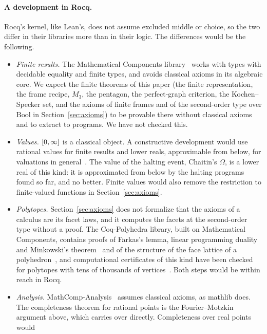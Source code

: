 \paragraph{A development in Rocq.}
Rocq's kernel, like Lean's, does not assume excluded middle or choice,
so the two differ in their libraries more than in their logic. The
differences would be the following.
\begin{itemize}
\item \emph{Finite results.} The Mathematical Components
  library~\cite{mathcomp} works with types with decidable equality and
  finite types, and avoids classical axioms in its algebraic core.
  We expect the finite theorems of this paper (the finite
  representation, the frame recipe, $M_3$, the pentagon, the
  perfect-graph criterion, the Kochen--Specker set, and the axioms of
  finite frames and of the second-order type over $\mathrm{Bool}$ in
  Section~\ref{sec:axioms}) to be provable
  there without classical axioms and to extract to programs. We have not
  checked this.
\item \emph{Values.} $[0,\infty]$ is a classical object. A constructive
  development would use rational values for finite results and lower
  reals, approximable from below, for valuations in
  general~\cite{vickers2008,coquand-spitters2009}. The value of the
  halting event, Chaitin's $\Omega$, is a lower real of this kind: it is
  approximated from below by the halting programs found so far, and no
  better. Finite values would also remove the restriction to
  finite-valued functions in Section~\ref{sec:axioms}.
\item \emph{Polytopes.} Section~\ref{sec:axioms} does not formalize
  that the axioms of a calculus are its facet laws, and it computes the
  facets at the second-order type without a proof. The Coq-Polyhedra
  library, built on Mathematical Components, contains proofs of Farkas's
  lemma, linear programming duality and Minkowski's
  theorem~\cite{allamigeon-katz2019} and of the structure of the face
  lattice of a polyhedron~\cite{allamigeon-katz-strub2022}, and
  computational certificates of this kind have been checked for polytopes
  with tens of thousands of vertices~\cite{allamigeon-canu-strub2023}.
  Both steps would be within reach in Rocq.
\item \emph{Analysis.} MathComp-Analysis~\cite{mathcomp-analysis}
  assumes classical axioms, as \textsf{mathlib} does. The completeness
  theorem for rational points is the Fourier--Motzkin argument above,
  which carries over directly. Completeness over real points would

\end{itemize}
